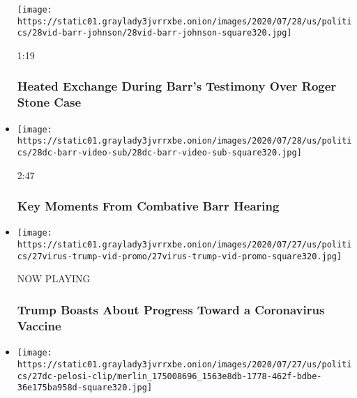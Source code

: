 \begin{itemize}
  \texttt{[image: https://static01.graylady3jvrrxbe.onion/images/2020/07/28/us/politics/28vid-barr-johnson/28vid-barr-johnson-square320.jpg]}

  1:19

  \hypertarget{heated-exchange-during-barrs-testimony-over-roger-stone-case}{%
  \subsubsection{Heated Exchange During Barr's Testimony Over Roger
  Stone
  Case}\label{heated-exchange-during-barrs-testimony-over-roger-stone-case}}
\item
  \href{https://www.nytimes3xbfgragh.onion/video/us/politics/100000007260259/barr-testifies-house-judiciary.html?action=click\&module=video-series-bar\&region=header\&pgtype=Article\&playlistId=video/us-politics}{}

  \texttt{[image: https://static01.graylady3jvrrxbe.onion/images/2020/07/28/us/politics/28dc-barr-video-sub/28dc-barr-video-sub-square320.jpg]}

  2:47

  \hypertarget{key-moments-from-combative-barr-hearing}{%
  \subsubsection{Key Moments From Combative Barr
  Hearing}\label{key-moments-from-combative-barr-hearing}}
\item
  \texttt{[image: https://static01.graylady3jvrrxbe.onion/images/2020/07/27/us/politics/27virus-trump-vid-promo/27virus-trump-vid-promo-square320.jpg]}

  NOW PLAYING

  \hypertarget{trump-boasts-about-progress-toward-a-coronavirus-vaccine-2}{%
  \subsubsection{Trump Boasts About Progress Toward a Coronavirus
  Vaccine}\label{trump-boasts-about-progress-toward-a-coronavirus-vaccine-2}}
\item
  \href{https://www.nytimes3xbfgragh.onion/video/us/100000007259050/john-lewis-memorial-pelosi.html?action=click\&module=video-series-bar\&region=header\&pgtype=Article\&playlistId=video/us-politics}{}

  \texttt{[image: https://static01.graylady3jvrrxbe.onion/images/2020/07/27/us/politics/27dc-pelosi-clip/merlin\_175008696\_1563e8db-1778-462f-bdbe-36e175ba958d-square320.jpg]}


\end{itemize}
